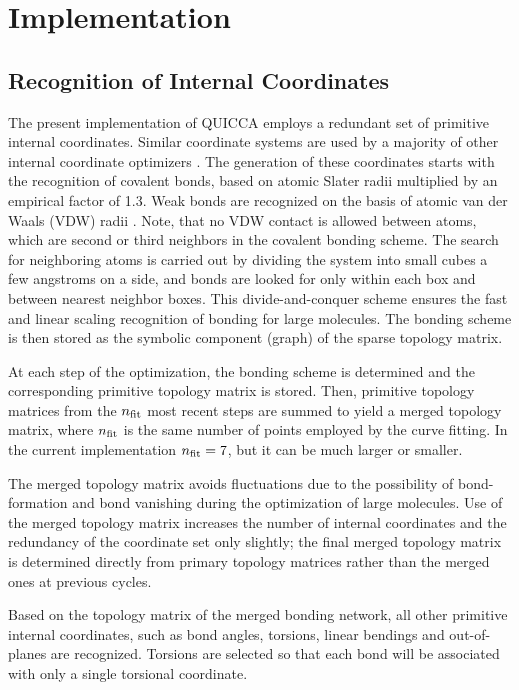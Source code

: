 \documentclass[prl,twocolumn,showpacs,twocolumngrid,superbib]{revtex4}
\begin{document}
\section{Implementation}\label{implementation}

\subsection{Recognition of Internal Coordinates} \label{recognition}

The present implementation of QUICCA employs a redundant set of primitive internal 
coordinates. Similar coordinate systems are used by a majority of other internal coordinate optimizers 
\cite{Pulay_natural_internals,fogarasi_diaghess,bakerstest,eckert,schlegel_on2iter}.  
The generation of these coordinates starts with the recognition of covalent bonds, 
based on atomic Slater radii \cite{SlaterRad}  multiplied by an empirical factor of 1.3. 
Weak bonds are recognized on the basis of atomic van der Waals (VDW) radii \cite{JMOLtable}.
Note, that no VDW contact is allowed between atoms, which are second or third neighbors in the 
covalent bonding scheme.  The search for neighboring atoms is carried out by dividing 
the system into small cubes a few angstroms on a side, and bonds are looked for only within 
each box and between nearest neighbor boxes.  This divide-and-conquer scheme ensures the fast 
and linear scaling recognition of bonding for large molecules.   The bonding scheme is then 
stored as the symbolic component (graph) of the sparse topology matrix.

At each step of the optimization, the  bonding scheme is determined and the corresponding 
primitive topology matrix is stored.  Then, primitive topology matrices from the 
$n_{\rm fit}$ most  recent steps are summed to yield a merged topology matrix, where 
$n_{\rm fit}$ is the same number of points employed by the curve fitting.   
In the current implementation $n_{\rm fit}=7$, but it can be much larger or smaller.  

The merged topology matrix avoids fluctuations due to the possibility of bond-formation and 
bond vanishing during the optimization of large molecules.  Use of the merged topology matrix
increases the number of internal coordinates and the redundancy of the coordinate set only slightly;
the final merged topology matrix is determined directly from primary topology matrices rather 
than the merged ones at previous cycles.

Based on the topology matrix of the merged bonding network, all other primitive 
internal coordinates, such as bond angles, torsions, linear bendings and 
out-of-planes are recognized. Torsions are selected so that each bond will be 
associated with only a single torsional coordinate.
\end{document}
